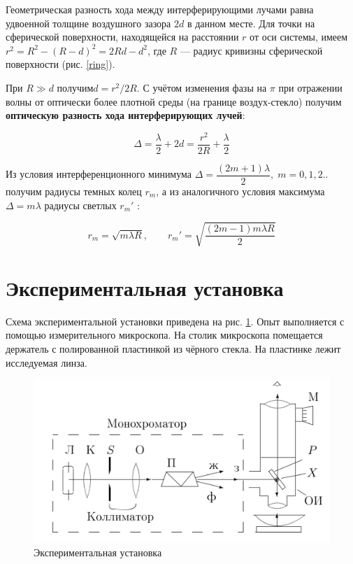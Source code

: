\documentclass[a4paper,12pt]{article}
\begin{document}
Геометрическая разность хода между интерферирующими лучами равна удвоенной толщине воздушного зазора $ 2d $ в данном месте. Для точки на сферической поверхности, находящейся на расстоянии $ r $ от оси системы, имеем $ r^2 = R^2 - (R - d)^2 = 2Rd - d^2 $, где $ R $ --- радиус кривизны сферической поверхности (рис. \ref{ring}).

При $ R \gg d $ получим$  d = r^2/2R $. С учётом изменения фазы на $ \pi $ при отражении волны от оптически более плотной среды (на границе воздух-стекло) получим \textbf{оптическую разность хода интерферирующих лучей}:

\begin{equation}\label{r_m}
\Delta = \dfrac{\lambda}{2} + 2d = \dfrac{r^2}{2R} + \dfrac{\lambda}{2}
\end{equation}

Из условия интерференционного минимума $ \Delta = \dfrac{(2m +1)\lambda}{2}, \; m =0, 1, 2.. $ получим радиусы темных колец $ r_m $, а из аналогичного условия максимума $ \Delta = m \lambda $ радиусы светлых $ r_m' $ :

\begin{equation}\label{r_m'}
r_m = \sqrt{m \lambda R}, \qquad 	r_m' = \sqrt{\dfrac{(2m-1)m \lambda R}{2}}
\end{equation}

\section*{Экспериментальная установка}

Схема экспериментальной установки приведена на рис. \ref{lab}. Опыт выполняется с помощью измерительного микроскопа.
На столик микроскопа помещается держатель с полированной пластинкой из
чёрного стекла. На пластинке лежит исследуемая линза.

\begin{figure} 
	\includegraphics[width=\linewidth]{lab}
	\caption{Экспериментальная установка}
	\label{lab}
\end{figure}
\end{document}
